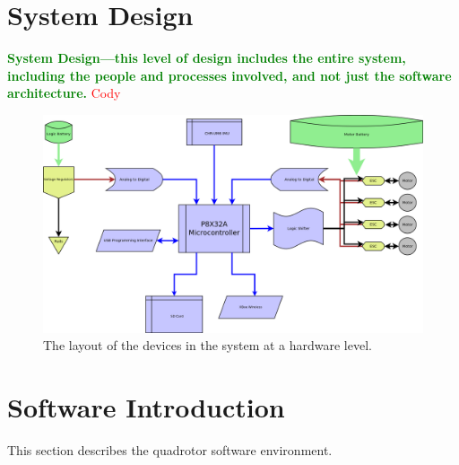 \documentclass{article}
\numberwithin{equation}{section} %
\begin{document}
\section{System Design}
\textcolor{green}{\bf System Design—this level of design includes the entire system, including the people and processes involved, and not just the software architecture.}
\textcolor{red}{Cody}

\begin{figure}[h!]
  \centering
	\includegraphics[scale=.22]{system_architecture.png}
  \caption{The layout of the devices in the system at a hardware level.}
\end{figure}  




\section{Software Introduction}
This section describes the quadrotor software environment.
\end{document}
